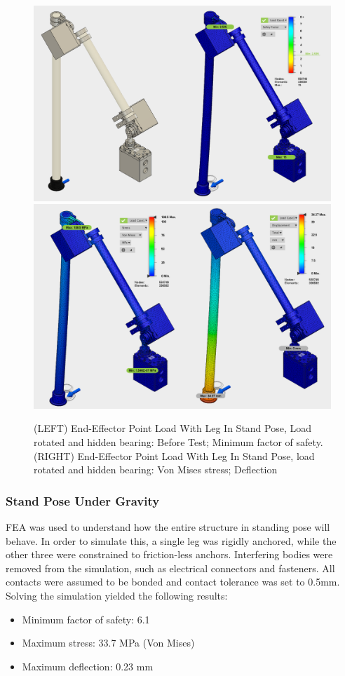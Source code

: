  
\begin{figure}
\centering
\includegraphics[width=0.48\columnwidth]{./img/aquaShoko-v3dot3-FEA-HidenBearing-1.png}\hspace{0.04\columnwidth}\includegraphics[width=0.48\columnwidth]{./img/aquaShoko-v3dot3-FEA-HidenBearing-2.png}
\caption{(LEFT) End-Effector Point Load With Leg In Stand Pose, Load rotated and hidden bearing: Before Test; Minimum factor of safety. (RIGHT) End-Effector Point Load With Leg In Stand Pose, load rotated and hidden bearing: Von Mises stress; Deflection}
\label{fig:FEA EE factor of safety no bearing}\label{fig:FEA EE defection no bearing}
\end{figure}













\subsubsection{Stand Pose Under Gravity}\label{sub:sub:Stand FEA} FEA was used to understand how the entire structure in standing pose will behave. In order to simulate this, a single leg was rigidly anchored, while the other three were constrained to friction-less anchors. Interfering bodies were removed from the simulation, such as electrical connectors and fasteners. All contacts were assumed to be bonded and contact tolerance was set to 0.5mm.
Solving the simulation yielded the following results:
 \begin{itemize}
     \item Minimum factor of safety: 6.1
     \item Maximum stress: 33.7 MPa (Von Mises)
     \item Maximum deflection: 0.23 mm 
 \end{itemize}
 
